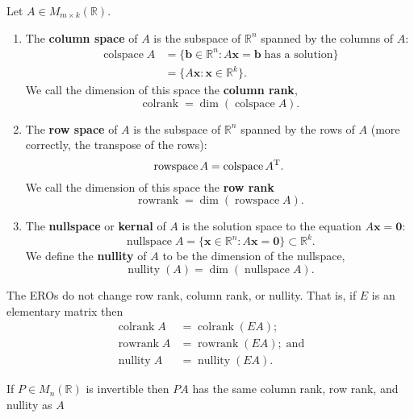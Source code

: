 \begin{definition}
    Let $A \in M_{m \times k}(\mathbb{R})$.
    \begin{enumerate}
        \item The \textbf{column space} of $A$ is the subspace of $\mathbb{R}^n$ spanned by the columns of $A$: \begin{align*}
            \operatorname{colspace}{A} &= \{\bm{b} \in \mathbb{R}^n : A \bm{x} = \bm{b} \; \text{has a solution}\} \\
            &= \{A \bm{x} : \bm{x} \in \mathbb{R}^k\}.
        \end{align*}
        We call the dimension of this space the \textbf{column rank}, \[\operatorname{colrank} = \dim{(\operatorname{colspace}{A})}.\]
        
        \item The \textbf{row space} of $A$ is the subspace of $\mathbb{R}^n$ spanned by the rows of $A$ (more correctly, the transpose of the rows): \[\operatorname{rowspace}{A} = \operatorname{colspace}{A^{\rm{T}}}.\]
        We call the dimension of this space the \textbf{row rank}\[\operatorname{rowrank} = \dim{(\operatorname{rowspace}{A})}.\]
        
        \item The \textbf{nullspace} or \textbf{kernal} of $A$ is the solution space to the equation $A \bm{x} = \bm{0}$: \[\operatorname{nullspace}{A}=\{\bm{x} \in \mathbb{R}^n : A \bm{x} = \bm{0}\} \subset \mathbb{R}^k.\] We define the \textbf{nullity} of $A$ to be the dimension of the nullspace, \[\operatorname{nullity}(A) = \dim{(\operatorname{nullspace}{A})}.\]
    \end{enumerate}
\end{definition}

\begin{proposition}\label{pro:ero_no_change_rank}
    The EROs do not change row rank, column rank, or nullity. That is, if $E$ is an elementary matrix then
    \begin{align*}
        \operatorname{colrank}{A} &= \operatorname{colrank}{(EA)}; \\
        \operatorname{rowrank}{A} &= \operatorname{rowrank}{(EA)};\;\text{and} \\
        \operatorname{nullity}{A} &= \operatorname{nullity}{(EA)}.
    \end{align*}
\end{proposition}

\begin{corollary}
    If $P \in M_n(\mathbb{R})$ is invertible then $PA$ has the same column rank, row rank, and nullity as $A$
\end{corollary}


